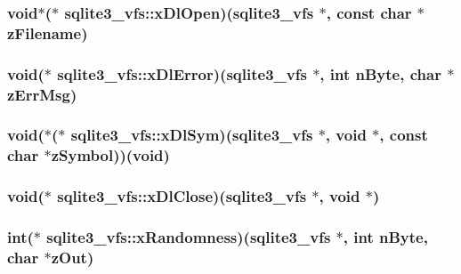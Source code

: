\hypertarget{structsqlite3__vfs_d896d84388d20f7e69fa277bc034eb68}{
\subsubsection[xDlOpen]{\setlength{\rightskip}{0pt plus 5cm}void$\ast$($\ast$ {\bf sqlite3\_\-vfs::xDlOpen})({\bf sqlite3\_\-vfs} $\ast$, const char $\ast$zFilename)}}
\label{structsqlite3__vfs_d896d84388d20f7e69fa277bc034eb68}


\hypertarget{structsqlite3__vfs_3cda3a00a43861cef4d5554354cdfda4}{
\subsubsection[xDlError]{\setlength{\rightskip}{0pt plus 5cm}void($\ast$ {\bf sqlite3\_\-vfs::xDlError})({\bf sqlite3\_\-vfs} $\ast$, int nByte, char $\ast$zErrMsg)}}
\label{structsqlite3__vfs_3cda3a00a43861cef4d5554354cdfda4}


\hypertarget{structsqlite3__vfs_20ef3dacb974e3e480782629cbbf7534}{
\subsubsection[xDlSym]{\setlength{\rightskip}{0pt plus 5cm}void($\ast$($\ast$ {\bf sqlite3\_\-vfs::xDlSym})({\bf sqlite3\_\-vfs} $\ast$, void $\ast$, const char $\ast$zSymbol))(void)}}
\label{structsqlite3__vfs_20ef3dacb974e3e480782629cbbf7534}


\hypertarget{structsqlite3__vfs_daa986b55a44971e7048d160ac5071ad}{
\subsubsection[xDlClose]{\setlength{\rightskip}{0pt plus 5cm}void($\ast$ {\bf sqlite3\_\-vfs::xDlClose})({\bf sqlite3\_\-vfs} $\ast$, void $\ast$)}}
\label{structsqlite3__vfs_daa986b55a44971e7048d160ac5071ad}


\hypertarget{structsqlite3__vfs_ce3fcb41cb01a947457532f645ba4c88}{
\subsubsection[xRandomness]{\setlength{\rightskip}{0pt plus 5cm}int($\ast$ {\bf sqlite3\_\-vfs::xRandomness})({\bf sqlite3\_\-vfs} $\ast$, int nByte, char $\ast$zOut)}}
\label{structsqlite3__vfs_ce3fcb41cb01a947457532f645ba4c88}


